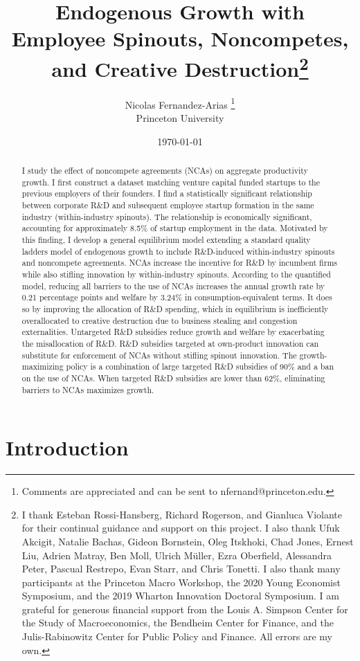\documentclass[11pt,english]{article}
\title{Endogenous Growth with Employee Spinouts, Noncompetes, and Creative Destruction\thanks{I thank Esteban Rossi-Hansberg, Richard Rogerson, and Gianluca Violante for their continual guidance and support on this project. I also thank Ufuk Akcigit, Natalie Bachas, Gideon Bornstein, Oleg Itskhoki, Chad Jones, Ernest Liu, Adrien Matray, Ben Moll, Ulrich M\"uller, Ezra Oberfield, Alessandra Peter, Pascual Restrepo, Evan Starr, and Chris Tonetti. I also thank many participants at the Princeton Macro Workshop, the 2020 Young Economist Symposium, and the 2019 Wharton Innovation Doctoral Symposium. I am grateful for generous financial support from the Louis A. Simpson Center for the Study of Macroeconomics, the Bendheim Center for Finance, and the Julis-Rabinowitz Center for Public Policy and Finance. All errors are my own.}}
\author{Nicolas Fernandez-Arias \thanks{Comments are appreciated and can be sent to nfernand@princeton.edu.}\\ Princeton University}
\date{\today}
\theoremstyle{definition}
\begin{document}
\begin{titlepage}
	\maketitle
	
	
	\begin{abstract}
		I study the effect of noncompete agreements (NCAs) on aggregate productivity growth. I first construct a dataset matching venture capital funded startups to the previous employers of their founders. I find a statistically significant relationship between corporate R\&D and subsequent employee startup formation in the same industry (within-industry spinouts). The relationship is economically significant, accounting for approximately 8.5\% of startup employment in the data. Motivated by this finding, I develop a general equilibrium model extending a standard quality ladders model of endogenous growth to include R\&D-induced within-industry spinouts and noncompete agreements. NCAs increase the incentive for R\&D by incumbent firms while also stifling innovation by within-industry spinouts. According to the quantified model, reducing all barriers to the use of NCAs increases the annual growth rate by 0.21 percentage points and welfare by 3.24\% in consumption-equivalent terms. It does so by improving the allocation of R\&D spending, which in equilibrium is inefficiently overallocated to creative destruction due to business stealing and congestion externalities. Untargeted R\&D subsidies reduce growth and welfare by exacerbating the misallocation of R\&D. R\&D subsidies targeted at own-product innovation can substitute for enforcement of NCAs without stifling spinout innovation. The growth-maximizing policy is a combination of large targeted R\&D subsidies of 90\% and a ban on the use of NCAs. When targeted R\&D subsidies are lower than 62\%, eliminating barriers to NCAs maximizes growth.
	\end{abstract}
\end{titlepage}






\section{Introduction}
\end{document}
